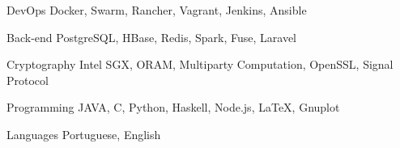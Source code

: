 

\begin{cvskills}

  \cvskill
    {DevOps} %
    {Docker, Swarm, Rancher, Vagrant, Jenkins, Ansible} %

  \cvskill
    {Back-end} %
    {PostgreSQL, HBase, Redis, Spark, Fuse, Laravel} %

  \cvskill
    {Cryptography} %
    {Intel SGX, ORAM, Multiparty Computation, OpenSSL, Signal Protocol} %

  \cvskill
    {Programming} %
    {JAVA, C, Python, Haskell, Node.js, LaTeX, Gnuplot} %

  \cvskill
    {Languages} %
    {Portuguese, English} %

\end{cvskills}
